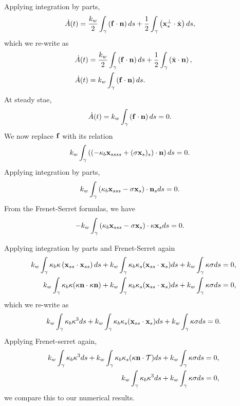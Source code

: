 \documentclass[twoside,twocolumn,9pt]{article}
\begin{document}
Applying integration by parts,
\begin{align}
    \dot{A}(t) &= \frac{k_w}{2}
    \int_{\gamma}\left(\mathbf{f}\cdot\mathbf{n}\right)ds+\frac{1}{2}\int_{\gamma}\left(\mathbf{x}^{\perp}_s\cdot\dot{\mathbf{x}}\right) ds,
\end{align}
which we re-write as
\begin{align}
    \dot{A}(t) &= \frac{k_w}{2}
    \int_{\gamma}\left(\mathbf{f}\cdot\mathbf{n}\right)ds+\frac{1}{2}\int_{\gamma}\left(\dot{\mathbf{x}}\cdot\mathbf{n}\right),\\
    \dot{A}(t) &= k_w \int_{\gamma}\left(\mathbf{f}\cdot\mathbf{n}\right)ds.
\end{align}
At steady stae,
\begin{align}
    \dot{A}(t) &= k_w \int_{\gamma}\left(\mathbf{f}\cdot\mathbf{n}\right)ds =0.
\end{align}
We now replace $\mathbf{f}$ with its relation
\begin{align}
   k_w\int_{\gamma}
   \left((-\kappa_b\mathbf{x}_{ssss}+(\sigma\mathbf{x}_s)_s)\cdot\mathbf{n}\right)ds &=0.
\end{align}
Applying integration by parts,
\begin{align}
     k_w\int_{\gamma}\left(\kappa_b\mathbf{x}_{sss}-\sigma\mathbf{x}_s\right)\cdot
     \mathbf{n}_s ds &=0.
\end{align}
From the Frenet-Serret formulas, we have 
\begin{align}
     -k_w\int_{\gamma}
     \left(\kappa_b\mathbf{x}_{sss}-\sigma\mathbf{x}_s\right)\cdot\kappa\mathbf{x}_s ds &=0.
\end{align}

Applying integration by parts and Frenet-Serret again
\begin{align}
     k_w\int_{\gamma}
     \kappa_b\kappa\left(\mathbf{x}_{ss}\cdot\mathbf{x}_{ss}\right)ds + k_w
     \int_{\gamma} \kappa_b \kappa_s(\mathbf{x}_{ss} \cdot \mathbf{x}_s)ds +k_w\int_{\gamma}\kappa\sigma ds  &= 0,\\
    k_w\int_{\gamma} \kappa_b\kappa(\kappa\mathbf{n} \cdot
     \kappa\mathbf{n})+ k_w \int_{\gamma} \kappa_b \kappa_s(\mathbf{x}_{ss} \cdot
     \mathbf{x}_s)ds +k_w\int_{\gamma}\kappa\sigma ds &= 0,
\end{align}
which we re-write as
\begin{align}
   k_w\int_{\gamma}\kappa_b\kappa^3 ds + k_w \int_{\gamma} \kappa_b
   \kappa_s(\mathbf{x}_{ss} \cdot \mathbf{x}_s)ds +k_w\int_{\gamma} \kappa\sigma ds = 0.
\end{align}
Applying Frenet-serret again,
\begin{align}
    k_w\int_{\gamma}\kappa_b\kappa^3 ds + k_w \int_{\gamma} \kappa_b
    \kappa_s(\kappa\mathbf{n} \cdot \mathcal{T})ds +k_w\int_{\gamma} \kappa\sigma ds = 0, \\
    k_w\int_{\gamma}\kappa_b\kappa^3 ds +k_w\int_{\gamma} \kappa\sigma ds  = 0, 
\end{align}
we compare this to our numerical results.
\end{document}
